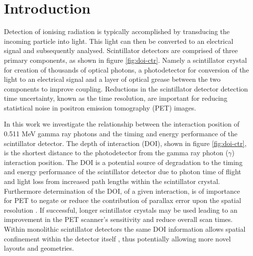 \section{Introduction} 
Detection of ionising radiation is typically accomplished by transducing the incoming particle into light. This light can then be converted to an electrical signal and subsequently analysed. Scintillator detectors are comprised of three primary components, as shown in figure \ref{fig:doi-ctr}. Namely a scintillator crystal for creation of thousands of optical photons, a photodetector for conversion of the light to an electrical signal and a layer of optical grease between the two components to improve coupling. Reductions in the scintillator detector detection time uncertainty, known as the time resolution, are important for reducing statistical noise in positron emission tomography (PET) images\cite{Moses_Ullisch_2006}.

In this work we investigate the relationship between the interaction position of 0.511 MeV gamma ray photons and the timing and energy performance of the scintillator detector. The depth of interaction (DOI), shown in figure \ref{fig:doi-ctr}, is the shortest distance to the photodetector from the gamma ray photon ($\gamma$) interaction position. The DOI is a potential source of degradation to the timing and energy performance of the scintillator detector due to photon time of flight and light loss from increased path lengths within the scintillator crystal. Furthermore determination of the DOI, of a given interaction, is of importance for PET to negate or reduce the contribution of parallax error upon the spatial resolution \cite{Moses_2001}\cite{Humm_Rosenfeld_Del_Guerra_2003}. If successful, longer scintillator crystals may be used leading to an improvement in the PET scanner's sensitivity and reduce overall scan times. Within monolithic scintillator detectors the same DOI information allows spatial confinement within the detector itself \cite{am_Borghi_Seifert_Schaart_2013}\cite{Maas_Bruyndonckx_Schaart_2012}, thus potentially allowing more novel\cite{Dendooven_Lohner_Beekman_2009}\cite{n_der_Lei_van_Dam_Schaart_2013} layouts and geometries.

